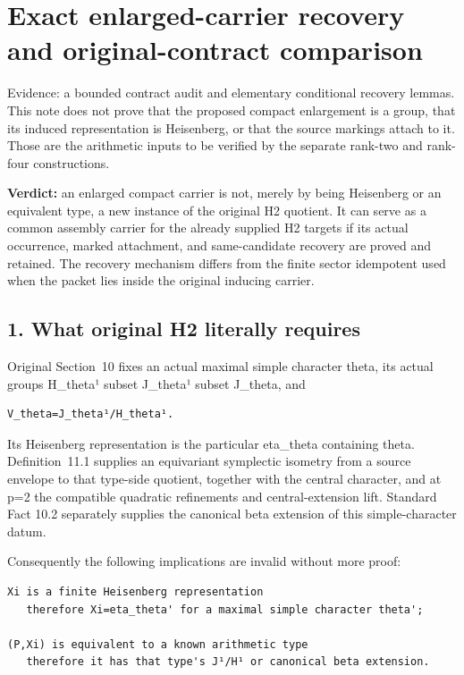 \clearpage
\section{Exact enlarged-carrier recovery and original-contract comparison}\label{app:lowrank_contract}

Evidence: a bounded contract audit and elementary conditional recovery
lemmas. This note does not prove that the proposed compact enlargement
is a group, that its induced representation is Heisenberg, or that the
source markings attach to it. Those are the arithmetic inputs to be
verified by the separate rank-two and rank-four constructions.

\textbf{Verdict:} an enlarged compact carrier is not, merely by being
Heisenberg or an equivalent type, a new instance of the original H2
quotient. It can serve as a common assembly carrier for the already
supplied H2 targets if its actual occurrence, marked attachment, and
same-candidate recovery are proved and retained. The recovery mechanism
differs from the finite sector idempotent used when the packet lies
inside the original inducing carrier.

\hypertarget{lowrank_contract-what-original-h2-literally-requires}{%
\subsection{1. What original H2 literally
requires}\label{lowrank_contract-what-original-h2-literally-requires}}

Original Section~10 fixes an actual maximal simple character theta, its
actual groups H\_theta¹ subset J\_theta¹ subset J\_theta, and

\begin{Verbatim}[fontsize=\small,breaklines=true,breakanywhere=true]
V_theta=J_theta¹/H_theta¹.
\end{Verbatim}

Its Heisenberg representation is the particular eta\_theta containing
theta. Definition~11.1 supplies an equivariant symplectic isometry from a
source envelope to that type-side quotient, together with the central
character, and at p=2 the compatible quadratic refinements and
central-extension lift. Standard Fact 10.2 separately supplies the
canonical beta extension of this simple-character datum.

Consequently the following implications are invalid without more proof:

\begin{Verbatim}[fontsize=\small,breaklines=true,breakanywhere=true]
Xi is a finite Heisenberg representation
   therefore Xi=eta_theta' for a maximal simple character theta';

(P,Xi) is equivalent to a known arithmetic type
   therefore it has that type's J¹/H¹ or canonical beta extension.
\end{Verbatim}

